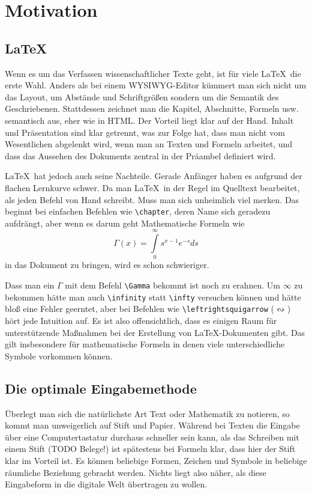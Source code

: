 \chapter{Motivation}

\section{\LaTeX}

Wenn es um das Verfassen wissenschaftlicher Texte geht, ist für viele \LaTeX\ die erste Wahl. Anders als bei einem \acs{WYSIWYG}-Editor kümmert man sich nicht um das Layout, um Abstände und Schriftgrößen sondern um die Semantik des Geschriebenen. Stattdessen zeichnet man die Kapitel, Abschnitte, Formeln usw. semantisch aus, eher wie in \acs{HTML}. Der Vorteil liegt klar auf der Hand. Inhalt und Präsentation sind klar getrennt, was zur Folge hat, dass man nicht vom Wesentlichen abgelenkt wird, wenn man an Texten und Formeln arbeitet, und dass das Aussehen des Dokuments zentral in der Präambel definiert wird.

\LaTeX\ hat jedoch auch seine Nachteile. Gerade Anfänger haben es aufgrund der flachen Lernkurve schwer. Da man \LaTeX\ in der Regel im Quelltext bearbeitet, als jeden Befehl von Hand schreibt. Muss man sich unheimlich viel merken. Das beginnt bei einfachen Befehlen wie \texttt{\textbackslash chapter}, deren Name sich geradezu aufdrängt, aber wenn es darum geht Mathematische Formeln wie $$\Gamma \left( x \right) = \int\limits_0^\infty  {s^{x - 1} e^{ - s} ds}$$ in das Dokument zu bringen, wird es schon schwieriger.

Dass man ein $\Gamma$ mit dem Befehl \texttt{\textbackslash Gamma} bekommt ist noch zu erahnen. Um $\infty$ zu bekommen hätte man auch \texttt{\textbackslash infinity} statt \texttt{\textbackslash infty} versuchen können und hätte bloß eine Fehler geerntet, aber bei Befehlen wie \texttt{\textbackslash leftrightsquigarrow} ($\leftrightsquigarrow$) hört jede Intuition auf. Es ist also offensichtlich, dass es einigen Raum für unterstützende Maßnahmen bei der Erstellung von \LaTeX-Dokumenten gibt. Das gilt insbesondere für mathematische Formeln in denen viele unterschiedliche Symbole vorkommen können.

\section{Die optimale Eingabemethode}

Überlegt man sich die natürlichste Art Text oder Mathematik zu notieren, so kommt man unweigerlich auf Stift und Papier. Während bei Texten die Eingabe über eine Computertastatur durchaus schneller sein kann, als das Schreiben mit einem Stift (TODO Belege!) ist spätestens bei Formeln klar, dass hier der Stift klar im Vorteil ist. Es können beliebige Formen, Zeichen und Symbole in beliebige räumliche Beziehung gebracht werden. Nichts liegt also näher, als diese Eingabeform in die digitale Welt übertragen zu wollen.

